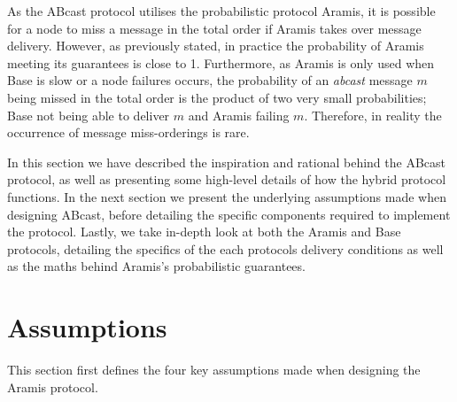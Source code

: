 As the \textsf{ABcast} protocol utilises the probabilistic protocol \textsf{Aramis}, it is possible for a node to miss a message in the total order if \textsf{Aramis} takes over message delivery.  However, as previously stated, in practice the probability of \textsf{Aramis} meeting its guarantees is close to 1.  Furthermore, as \textsf{Aramis} is only used when \textsf{Base} is slow or a node failures occurs, the probability of an \emph{abcast} message $m$ being missed in the total order is the product of two very small probabilities; \textsf{Base} not being able to deliver $m$ and \textsf{Aramis} failing $m$.  Therefore, in reality the occurrence of message miss-orderings is rare.  

In this section we have described the inspiration and rational behind the \textsf{ABcast} protocol, as well as presenting some high-level details of how the hybrid protocol functions.  In the next section we present the underlying assumptions made when designing \textsf{ABcast}, before detailing the specific components required to implement the protocol.  Lastly, we take in-depth look at both the \textsf{Aramis} and \textsf{Base} protocols, detailing the specifics of the each protocols delivery conditions as well as the maths behind \textsf{Aramis}'s probabilistic guarantees.  

\newpage
\section{Assumptions}
	This section first defines the four key assumptions made when designing the \textsf{Aramis} protocol. 

